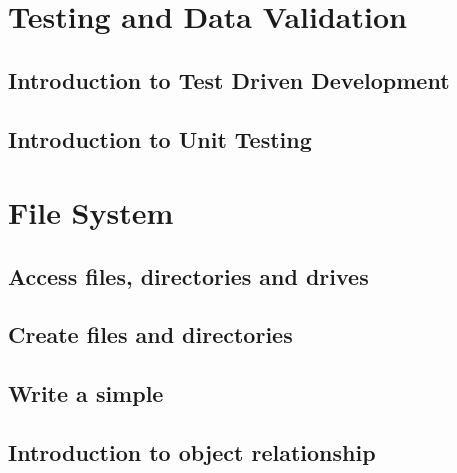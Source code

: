 \documentclass[
]{book}
\theoremstyle{definition}
\theoremstyle{definition}
\theoremstyle{definition}
\theoremstyle{remark}
\begin{document}
\hypertarget{testing-and-data-validation}{%
\chapter{Testing and Data Validation}\label{testing-and-data-validation}}

\hypertarget{introduction-to-test-driven-development}{%
\section{Introduction to Test Driven Development}\label{introduction-to-test-driven-development}}

\hypertarget{introduction-to-unit-testing}{%
\section{Introduction to Unit Testing}\label{introduction-to-unit-testing}}

\hypertarget{file-system}{%
\chapter{File System}\label{file-system}}

\hypertarget{access-files-directories-and-drives}{%
\section{Access files, directories and drives}\label{access-files-directories-and-drives}}

\hypertarget{create-files-and-directories}{%
\section{Create files and directories}\label{create-files-and-directories}}

\hypertarget{write-a-simple}{%
\section{Write a simple}\label{write-a-simple}}

\hypertarget{introduction-to-object-relationship}{%
\section{Introduction to object relationship}\label{introduction-to-object-relationship}}

  
\end{document}
